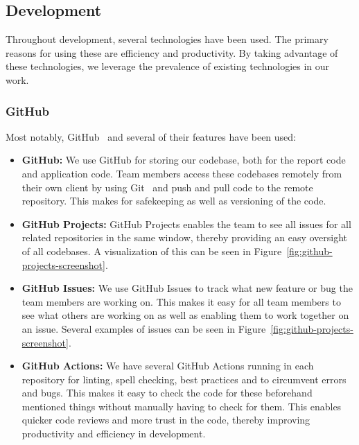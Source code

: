 \subsection{Development}\label{subsec:development}

Throughout development, several technologies have been used.
The primary reasons for using these are efficiency and productivity.
By taking advantage of these technologies, we leverage the prevalence of existing technologies in our work.

\subsubsection{GitHub}

Most notably, GitHub~\cite{github2024} and several of their features have been used:

\begin{itemize}
    \item \textbf{GitHub:}
    We use GitHub for storing our codebase, both for the report code and application code.
    Team members access these codebases remotely from their own client by using Git~\cite{git2024} and push and pull
    code to the remote repository.
    This makes for safekeeping as well as versioning of the code.
    \item \textbf{GitHub Projects:}
    GitHub Projects enables the team to see all issues for all related repositories in the same window, thereby
    providing an easy oversight of all codebases.
    A visualization of this can be seen in Figure~\ref{fig:github-projects-screenshot}.
    \item \textbf{GitHub Issues:}
    We use GitHub Issues to track what new feature or bug the team members are working on.
    This makes it easy for all team members to see what others are working on as well as enabling them to work together
    on an issue.
    Several examples of issues can be seen in Figure~\ref{fig:github-projects-screenshot}.
    \item \textbf{GitHub Actions:}
    We have several GitHub Actions running in each repository for linting, spell checking, best practices and to
    circumvent errors and bugs.
    This makes it easy to check the code for these beforehand mentioned things without manually having to check for
    them.
    This enables quicker code reviews and more trust in the code, thereby improving productivity and efficiency in
    development.
\end{itemize}

